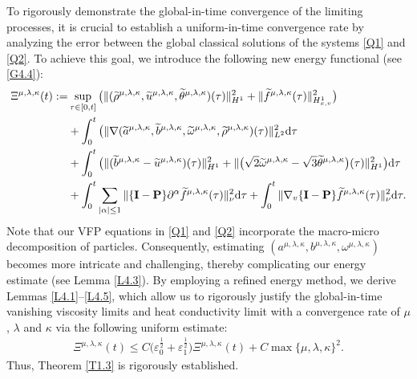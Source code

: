 \documentclass[reqno,11pt]{amsart}
\theoremstyle{plain}
\numberwithin{equation}{section}
\newcommand{\eps}{{\varepsilon}}
\begin{document}
To rigorously demonstrate the global-in-time convergence of the limiting processes,
 it is crucial to establish a uniform-in-time  convergence rate by analyzing the error 
 between the global classical solutions of the systems \eqref{Q1} and \eqref{Q2}. 
 To achieve this goal, we introduce the following new energy functional (see \eqref{G4.4}):  
\begin{align*}  
\Xi^{\mu,\lambda,\kappa}(t) :=&\sup_{\tau\in[0,t]}
\big(\|(\widetilde{\rho}^{\mu,\lambda,\kappa},
\widetilde{u}^{\mu,\lambda,\kappa} ,
\widetilde{\theta}^{\mu,\lambda,\kappa})(\tau)\|_{H^1}^2 
+\|\widetilde{f}^{\mu,\lambda,\kappa}(\tau)\|_{H_{x,v}^1}^2\big) \nonumber\\
&+\int_{0}^t\big( \|\nabla(\widetilde{a}^{\mu,\lambda,\kappa},
\widetilde{b}^{\mu,\lambda,\kappa},\widetilde{\omega}^{\mu,\lambda,\kappa},
\widetilde{\rho}^{\mu,\lambda,\kappa})(\tau)\|_{L^2}^2 {\rm d}\tau\nonumber\\  
&+\int_{0}^t\big(   \|(\widetilde{b}^{\mu,\lambda,\kappa}-\widetilde{u}^{\mu,
\lambda,\kappa})(\tau)\|_{H^1}^2 + \|\big(\sqrt{2}\widetilde{\omega}^{\mu,
\lambda,\kappa}-\sqrt{3}\widetilde{\theta}^{\mu,\lambda,\kappa}\big)(\tau)\|_{H^1}^2 
\big){\rm d}\tau\nonumber\\  
&+\int_0^t\sum_{|\alpha|\leq 1}\|\{\mathbf{I}
-\mathbf{P}\}\partial^\alpha\widetilde{f}^{\mu,\lambda,\kappa}(\tau)\|_{\nu}^2{\rm d}\tau
+\int_0^t \|\nabla_v \{\mathbf{I}-\mathbf{P}\}\widetilde{f}^{\mu,\lambda,\kappa}(\tau)\|_{\nu}^2{\rm d}\tau.  
\end{align*}  
Note that our VFP equations in \eqref{Q1} and \eqref{Q2} incorporate  the macro-micro 
decomposition of particles. Consequently, estimating $(a^{\mu,\lambda,\kappa},
 b^{\mu,\lambda,\kappa}, \omega^{\mu,\lambda,\kappa})$ 
becomes more intricate and challenging, thereby complicating our energy estimate 
(see Lemma \ref{L4.3}). By employing a refined energy method, we derive 
Lemmas \ref{L4.1}--\ref{L4.5}, which allow us to rigorously justify the 
global-in-time vanishing viscosity limits and
heat conductivity limit with a convergence rate of $\mu$, $\lambda$ and $ {\kappa}$
 via the following uniform estimate:  
\begin{align*}  
{\Xi} ^{\mu,\lambda,\kappa}(t) \leq C \big(\eps_0^{\frac{1}{2}} + \eps_1^{\frac{1}{2}}\big){\Xi} ^{\mu,\lambda,\kappa}(t) + C\max\{\mu,\lambda,\kappa\}^2.  
\end{align*}  
Thus, Theorem \ref{T1.3} is rigorously established.
\end{document}
